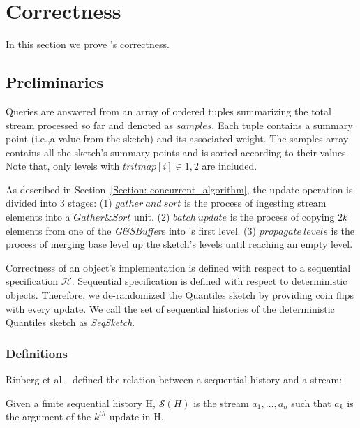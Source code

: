 \chapter{Correctness}
\label{chap:correctness}


In this section we prove \mysketch's correctness. 

\section{Preliminaries}

Queries are answered from an array of ordered tuples summarizing the total stream processed so far and denoted as $\mathit{samples}$. Each tuple contains a summary point (i.e.,a value from the sketch) and its associated weight. The samples array contains all the sketch's summary points and is sorted according to their values. Note that, only levels with $\mathit{tritmap}[i]\in{1,2}$ are included.

As described in Section~\ref{Section: concurrent_algorithm}, the update operation is divided into 3 stages: 
(1) $\mathit{gather\ and\ sort}$ is the process of ingesting stream elements into a $\mathit{Gather\&Sort}$ unit.
(2) $\mathit{batch\ update}$ is the process of copying $2k$ elements from one of the \emph{G\&SBuffer}s into \mysketch's first level. 
(3) $\mathit{propagate\ levels}$ is the process of merging base level up the sketch's levels until reaching an empty level. 



Correctness of an object's implementation is defined with respect to a sequential specification $\mathcal{H}$. Sequential specification is defined with respect to deterministic objects. Therefore, we de-randomized the Quantiles sketch by providing coin flips with every update. We call the set of sequential histories of the deterministic Quantiles sketch as \emph{SeqSketch}.

\subsection{Definitions}

Rinberg et al.~\cite{Rinberg_2020_fast_sketches} defined the relation between a sequential history and a stream:
\begin{definition} 
Given a finite sequential history H, $\mathcal{S}(H)$ is the stream $a_1,\dots,a_n$ such that $a_k$ is the argument of the $k^{th}$ update in H.
\end{definition}


